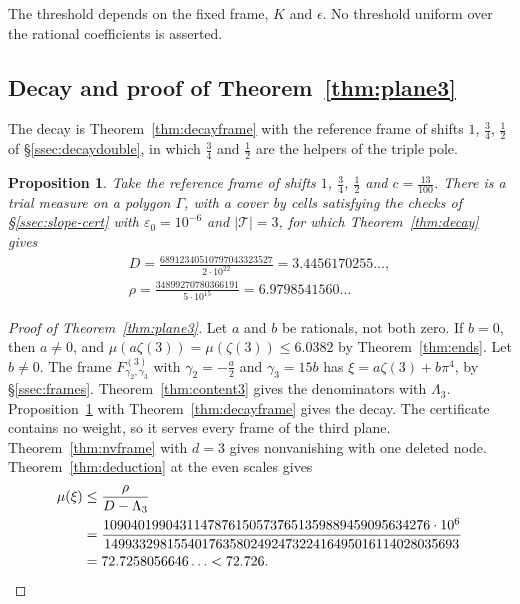 \documentclass[11pt]{amsart}
\newtheorem{proposition}[theorem]{Proposition}
\theoremstyle{definition}
\theoremstyle{remark}
\numberwithin{equation}{section}
\newcommand{\MuPlaneC}{72.726}
\newcommand{\MuZetaThree}{6.0382}
\begin{document}
The threshold depends on the fixed frame, $K$ and $\epsilon$. No threshold uniform over the rational coefficients is asserted.

\subsection{Decay and proof of Theorem~\ref{thm:plane3}}
The decay is Theorem~\ref{thm:decayframe} with the reference frame of shifts $1$, $\frac34$, $\frac12$ of
\S\ref{ssec:decaydouble}, in which $\frac34$ and $\frac12$ are the helpers of the triple pole.

\begin{proposition}\label{prop:cert3}
Take the reference frame of shifts $1$, $\frac34$, $\frac12$ and $c=\frac{13}{100}$. There is a trial measure on a polygon
$\Gamma$, with a cover by cells satisfying the checks of \S\ref{ssec:slope-cert} with $\varepsilon_0=10^{-6}$ and
$|\mathcal T|=3$, for which Theorem~\ref{thm:decay} gives
\begin{gather*}
 D=\frac{68912340510797043323527}{2\cdot10^{22}}=3.4456170255\ldots,\\
 \rho=\frac{34899270780366191}{5\cdot10^{15}}=6.9798541560\ldots
\end{gather*}
\end{proposition}

\begin{proof}[Proof of Theorem~\ref{thm:plane3}]
Let $a$ and $b$ be rationals, not both zero. If $b=0$, then $a\ne0$, and $\mu(a\zeta(3))=\mu(\zeta(3))\le\MuZetaThree$ by
Theorem~\ref{thm:ends}. Let $b\ne0$. The frame $F^{(3)}_{\gamma_2,\gamma_3}$ with $\gamma_2=-\frac a2$ and
$\gamma_3=15b$ has $\xi=a\zeta(3)+b\pi^4$, by \S\ref{ssec:frames}. Theorem~\ref{thm:content3} gives the denominators
with $\Lambda_3$. Proposition~\ref{prop:cert3} with Theorem~\ref{thm:decayframe} gives the decay. The certificate
contains no weight, so it serves every frame of the third plane. Theorem~\ref{thm:nvframe} with $d=3$ gives
nonvanishing with one deleted node. Theorem~\ref{thm:deduction} at the even scales gives
\[
 \begin{aligned}
 \mu(\xi)&\le\frac\rho{D-\Lambda_3}\\
 &=\frac{10904019904311478761505737651359889459095634276\cdot10^{6}}
 {149933298155401763580249247322416495016114028035693}\\
 &=72.7258056646\ldots<\MuPlaneC .
 \end{aligned}\qedhere
\]
\end{proof}
\end{document}
